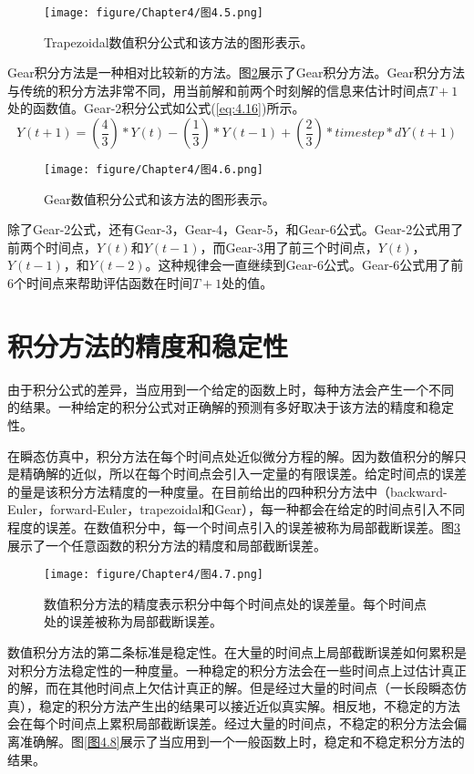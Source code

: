 \begin{figure}[htbp]
\small
    \centering
    \texttt{[image: figure/Chapter4/图4.5.png]}
    \caption{Trapezoidal数值积分公式和该方法的图形表示。}
    \label{图4.5}
\end{figure}

Gear积分方法\cite{Gear}是一种相对比较新的方法。图\ref{图4.6}展示了Gear积分方法。Gear积分方法与传统的积分方法非常不同，用当前解和前两个时刻解的信息来估计时间点$T+1$处的函数值。Gear-2积分公式如公式(\ref{eq:4.16})所示。
\begin{equation}
    Y(t+1)=(\frac{4}{3})*Y(t)-(\frac{1}{3})*Y(t-1)+(\frac{2}{3})*timestep*dY(t+1)
\end{equation}

\begin{figure}[htbp]
\small
    \centering
    \texttt{[image: figure/Chapter4/图4.6.png]}
    \caption{Gear数值积分公式和该方法的图形表示。}
    \label{图4.6}
\end{figure}

除了Gear-2公式，还有Gear-3，Gear-4，Gear-5，和Gear-6公式。Gear-2公式用了前两个时间点，$Y(t)$和$Y(t-1)$，而Gear-3用了前三个时间点，$Y(t)$，$Y(t-1)$，和$Y(t-2)$。这种规律会一直继续到Gear-6公式。Gear-6公式用了前6个时间点来帮助评估函数在时间$T+1$处的值。

\section{积分方法的精度和稳定性}
由于积分公式的差异，当应用到一个给定的函数上时，每种方法会产生一个不同 的结果。一种给定的积分公式对正确解的预测有多好取决于该方法的精度和稳定性。

在瞬态仿真中，积分方法在每个时间点处近似微分方程的解。因为数值积分的解只是精确解的近似，所以在每个时间点会引入一定量的有限误差。给定时间点的误差的量是该积分方法精度的一种度量。在目前给出的四种积分方法中（backward-Euler，forward-Euler，trapezoidal和Gear），每一种都会在给定的时间点引入不同程度的误差。在数值积分中，每一个时间点引入的误差被称为局部截断误差。图\ref{图4.7}展示了一个任意函数的积分方法的精度和局部截断误差。

\begin{figure}[htbp]
\small
    \centering
    \texttt{[image: figure/Chapter4/图4.7.png]}
    \caption{数值积分方法的精度表示积分中每个时间点处的误差量。每个时间点处的误差被称为局部截断误差。}
    \label{图4.7}
\end{figure}

数值积分方法的第二条标准是稳定性。在大量的时间点上局部截断误差如何累积是对积分方法稳定性的一种度量。一种稳定的积分方法会在一些时间点上过估计真正的解，而在其他时间点上欠估计真正的解。但是经过大量的时间点（一长段瞬态仿真），稳定的积分方法产生出的结果可以接近近似真实解。相反地，不稳定的方法会在每个时间点上累积局部截断误差。经过大量的时间点，不稳定的积分方法会偏离准确解。图\ref{图4.8}展示了当应用到一个一般函数上时，稳定和不稳定积分方法的结果。

